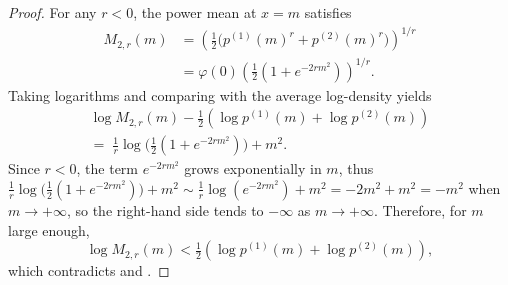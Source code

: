 \documentclass[accepted]{uai2026} %
\begin{document}
\begin{proof}
For any $r<0$, the power mean at $x=m$ satisfies
\begin{align}
M_{2,r}(m)
& =\left(\tfrac12\big(p^{(1)}(m)^r+p^{(2)}(m)^r\big)\right)^{1/r} \\
& =\varphi(0)\left(\tfrac12(1+e^{-2rm^2})\right)^{1/r}.
\end{align}
Taking logarithms and comparing with the average log-density yields
\begin{equation}
\begin{aligned}
\log M_{2,r}(m)
-\tfrac12\!\left(\log p^{(1)}(m)+\log p^{(2)}(m)\right)
\\
=\;
\frac{1}{r}\log\!\Big(\tfrac12(1+e^{-2rm^2})\Big)+m^2.
\end{aligned}
\end{equation}
Since $r<0$, the term $e^{-2rm^2}$ grows exponentially in $m$, thus  $\frac{1}{r}\log\!\Big(\tfrac12(1+e^{-2rm^2}) \Big) + m^2 \sim \frac{1}{r}\log(e^{-2rm^2}) + m^2 = -2m^2 + m^2 = -m^2$ when $m\to+\infty$, so the right-hand side tends to $-\infty$ as $m\to+\infty$.
Therefore, for $m$ large enough,
\begin{equation}
\log M_{2,r}(m)
<
\tfrac12\!\left(\log p^{(1)}(m)+\log p^{(2)}(m)\right),
\end{equation}
which contradicts  and .



\end{proof}
\end{document}
